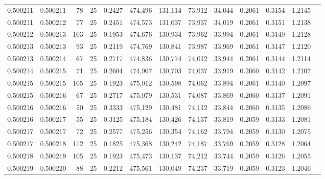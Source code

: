 \begin{tabular}{rrrrrrrrrrrrr}
0.500211 & 0.500211 &  78 &  25 &                                     0.2427 & 474,496 & 131,114 &  73,912 &  34,044 & 0.2061 & 0.3154 & 1.2145 \\
0.500211 & 0.500212 &  77 &  25 &                                     0.2451 & 474,573 & 131,037 &  73,937 &  34,019 & 0.2061 & 0.3151 & 1.2138 \\
0.500212 & 0.500213 & 103 &  25 &                                     0.1953 & 474,676 & 130,934 &  73,962 &  33,994 & 0.2061 & 0.3149 & 1.2128 \\
0.500213 & 0.500213 &  93 &  25 &                                     0.2119 & 474,769 & 130,841 &  73,987 &  33,969 & 0.2061 & 0.3147 & 1.2120 \\
0.500213 & 0.500214 &  67 &  25 &                                     0.2717 & 474,836 & 130,774 &  74,012 &  33,944 & 0.2061 & 0.3144 & 1.2114 \\
0.500214 & 0.500215 &  71 &  25 &                                     0.2604 & 474,907 & 130,703 &  74,037 &  33,919 & 0.2060 & 0.3142 & 1.2107 \\
0.500215 & 0.500215 & 105 &  25 &                                     0.1923 & 475,012 & 130,598 &  74,062 &  33,894 & 0.2061 & 0.3140 & 1.2097 \\
0.500215 & 0.500216 &  67 &  25 &                                     0.2717 & 475,079 & 130,531 &  74,087 &  33,869 & 0.2060 & 0.3137 & 1.2091 \\
0.500216 & 0.500216 &  50 &  25 &                                     0.3333 & 475,129 & 130,481 &  74,112 &  33,844 & 0.2060 & 0.3135 & 1.2086 \\
0.500216 & 0.500217 &  55 &  25 &                                     0.3125 & 475,184 & 130,426 &  74,137 &  33,819 & 0.2059 & 0.3133 & 1.2081 \\
0.500217 & 0.500217 &  72 &  25 &                                     0.2577 & 475,256 & 130,354 &  74,162 &  33,794 & 0.2059 & 0.3130 & 1.2075 \\
0.500217 & 0.500218 & 112 &  25 &                                     0.1825 & 475,368 & 130,242 &  74,187 &  33,769 & 0.2059 & 0.3128 & 1.2064 \\
0.500218 & 0.500219 & 105 &  25 &                                     0.1923 & 475,473 & 130,137 &  74,212 &  33,744 & 0.2059 & 0.3126 & 1.2055 \\
0.500219 & 0.500220 &  88 &  25 &                                     0.2212 & 475,561 & 130,049 &  74,237 &  33,719 & 0.2059 & 0.3123 & 1.2046 \\

\end{tabular}
